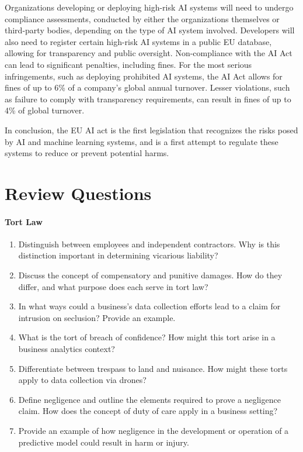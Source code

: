 Organizations developing or deploying high-risk AI systems will need to undergo compliance assessments, conducted by either the organizations themselves or third-party bodies, depending on the type of AI system involved. Developers will also need to register certain high-risk AI systems in a public EU database, allowing for transparency and public oversight. Non-compliance with the AI Act can lead to significant penalties, including fines. For the most serious infringements, such as deploying prohibited AI systems, the AI Act allows for fines of up to 6\% of a company's global annual turnover. Lesser violations, such as failure to comply with transparency requirements, can result in fines of up to 4\% of global turnover.

In conclusion, the EU AI act is the first legislation that recognizes the risks posed by AI and machine learning systems, and is a first attempt to regulate these systems to reduce or prevent potential harms.


\FloatBarrier

\section{Review Questions}
\paragraph*{Tort Law}
\begin{enumerate}[nosep]
	\item Distinguish between employees and independent contractors. Why is this distinction important in determining vicarious liability?
	\item Discuss the concept of compensatory and punitive damages. How do they differ, and what purpose does each serve in tort law?
	\item In what ways could a business's data collection efforts lead to a claim for intrusion on seclusion? Provide an example.
	\item What is the tort of breach of confidence? How might this tort arise in a business analytics context?
	\item Differentiate between trespass to land and nuisance. How might these torts apply to data collection via drones?
	\item Define negligence and outline the elements required to prove a negligence claim. How does the concept of duty of care apply in a business setting?
	\item Provide an example of how negligence in the development or operation of a predictive model could result in harm or injury.
\end{enumerate}
